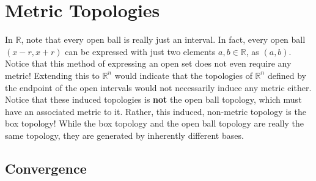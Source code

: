 \section{Metric Topologies}

  In $\mathbb{R}$, note that every open ball is really just an interval. In fact, every open ball $(x - r, x + r)$ can be expressed with just two elements $a, b \in \mathbb{R}$, as $(a, b)$. Notice that this method of expressing an open set does not even require any metric! Extending this to $\mathbb{R}^n$ would indicate that the topologies of $\mathbb{R}^n$ defined by the endpoint of the open intervals would not necessarily induce any metric either. Notice that these induced topologies is \textbf{not} the open ball topology, which must have an associated metric to it. Rather, this induced, non-metric topology is the box topology! While the box topology and the open ball topology are really the same topology, they are generated by inherently different bases. 

\subsection{Convergence}

